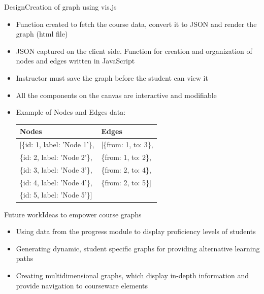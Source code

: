 \documentclass[xcolor=table]{beamer}
\begin{document}
\begin{frame}{Design}{Creation of graph using vis.js}
	\begin{itemize}
		\item Function created to fetch the course data, convert it to JSON and render the graph (html file)
		\item JSON captured on the client side. Function for creation and organization of nodes and edges written in JavaScript
		\item Instructor must save the graph before the student can view it
		\item All the components on the canvas are interactive and modifiable
		\item Example of Nodes and Edges data: \\
		\begin{table}[H]
			\centering
			\begin{tabular}{l|l}
				\hline \textbf{Nodes} & \textbf{Edges} \\ 
				\hline\hspace{-0.1cm}[\{id: 1, label: 'Node 1'\}, & \hspace{-0.1cm}[\{from: 1, to: 3\}, \\
				\{id: 2, label: 'Node 2'\}, & \{from: 1, to: 2\}, \\
				\{id: 3, label: 'Node 3'\}, & \{from: 2, to: 4\}, \\
				\{id: 4, label: 'Node 4'\}, & \{from: 2, to: 5\}] \\
				\{id: 5, label: 'Node 5'\}] & \\
				\hline 
			\end{tabular} 
		\end{table}
	\end{itemize}
\end{frame}

\begin{frame}{Future work}{Ideas to empower course graphs}
	\begin{itemize}
		\item Using data from the progress module to display proficiency levels of students
		\item Generating dynamic, student specific graphs for providing alternative learning paths
		\item Creating multidimensional graphs, which display in-depth information and provide navigation to courseware elements
	\end{itemize}
\end{frame}
\end{document}
